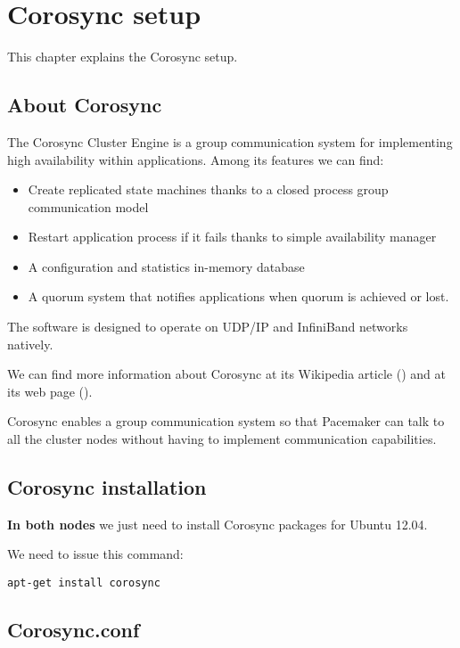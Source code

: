 

\chapter{Corosync setup}
\label{chap:corosync-setup}
This chapter explains the Corosync setup.

\section {About Corosync}
The Corosync Cluster Engine is a group communication system for implementing high availability within applications. Among its features we can find:
\begin{itemize}
  \item Create replicated state machines thanks to a closed process group communication model
  \item Restart application process if it fails thanks to simple availability manager
  \item A configuration and statistics in-memory database
  \item A quorum system that notifies applications when quorum is achieved or lost.
\end{itemize}


The software is designed to operate on UDP/IP and InfiniBand networks natively.

We can find more information about Corosync at its Wikipedia article (\cite{WikipediaCorosync}) and at its web page (\cite{CorosyncWebpage}).

Corosync enables a group communication system so that Pacemaker can talk to all the cluster nodes without having to implement communication capabilities.

\section {Corosync installation}
\textbf{In both nodes} we just need to install Corosync packages for Ubuntu 12.04.

We need to issue this command:
\begin{verbatim}
apt-get install corosync
\end{verbatim}


\section {Corosync.conf}

